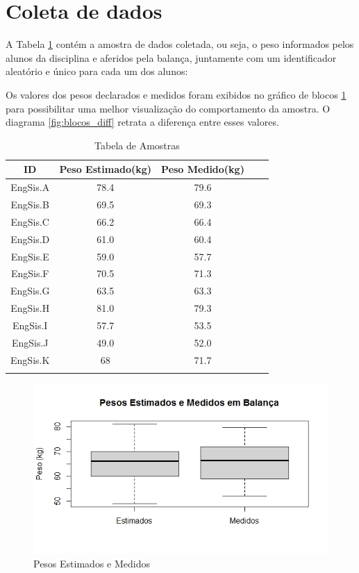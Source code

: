 \documentclass[12pt, a4paper]{article}
\begin{document}
\section{Coleta de dados}
A Tabela \ref{table:amostra} contém a amostra de dados coletada, ou seja, o peso informados pelos alunos da disciplina e aferidos pela balança, juntamente com um identificador aleatório e único para cada um dos alunos:
\par Os valores dos pesos declarados e medidos foram exibidos no gráfico de blocos \ref{fig:blocos} para possibilitar uma melhor visualização do comportamento da amostra. O diagrama \ref{fig:blocos_diff} retrata a diferença entre esses valores.
\pagebreak
\begin{longtable}{|c|c|c|c|c|}
\hline
\rule[-1.0ex]{0pt}{4.0ex}
\textbf{ID}&\textbf{Peso Estimado(kg)}&\textbf{Peso Medido(kg)}\\ \hline
\endhead
\rule[-1.0ex]{0pt}{4.0ex}
EngSis.A&78.4&79.6 \\ \hline
\rule[-1.0ex]{0pt}{4.0ex}
EngSis.B&69.5&69.3 \\ \hline
\rule[-1.0ex]{0pt}{4.0ex}
EngSis.C&66.2&66.4 \\ \hline
\rule[-1.0ex]{0pt}{4.0ex}
EngSis.D&61.0&60.4 \\ \hline
\rule[-1.0ex]{0pt}{4.0ex}
EngSis.E&59.0&57.7 \\ \hline
\rule[-1.0ex]{0pt}{4.0ex}
EngSis.F&70.5&71.3 \\ \hline
\rule[-1.0ex]{0pt}{4.0ex}
EngSis.G&63.5&63.3 \\ \hline
\rule[-1.0ex]{0pt}{4.0ex}
EngSis.H&81.0&79.3 \\ \hline
\rule[-1.0ex]{0pt}{4.0ex}
EngSis.I&57.7&53.5 \\ \hline
\rule[-1.0ex]{0pt}{4.0ex}
EngSis.J&49.0&52.0 \\ \hline
\rule[-1.0ex]{0pt}{4.0ex}
EngSis.K&68&71.7 \\ \hline
\caption{Tabela de Amostras}
\label{table:amostra}
\end{longtable}
\begin{figure}[h]
\centering
\includegraphics[scale=0.6]{img/box.jpeg}
\caption{Pesos Estimados e Medidos}
\label{fig:blocos}
\end{figure}
\end{document}
